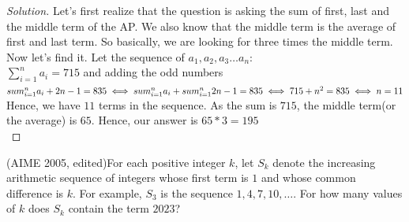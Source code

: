 \begin{proof}
    [Solution]
    Let's first realize that the question is asking the sum of first, last and the middle term of the AP. We also know that the middle term is the average of first and last term. So basically, we are looking for three times the middle term.\\
    Now let's find it. Let the sequence of $a_1,a_2,a_3 \dots a_n$:\\
    $\sum^n_{i=1}a_i=715$
    and adding the odd numbers\\
    $sum^n_{i=1}a_i+2n-1=835\\
    \iff sum^n_{i=1}a_i+sum^n_{i=1}2n-1=835\\
    \iff 715+n^2=835\\
    \iff n=11$\\
    Hence, we have $11$ terms in the sequence. As the sum is $715$, the middle term(or the average) is $65$. Hence, our answer is $65*3=195$\\
\end{proof}
\begin{example}
    (AIME 2005, edited)For each positive integer $k$, let $S_k$ denote the increasing arithmetic sequence of integers whose first term is $1$ and whose common difference is $k$. For example, $S_3$ is the sequence $1,4,7,10,\ldots.$ For how many values of $k$ does $S_k$ contain the term $2023$?
\end{example}
